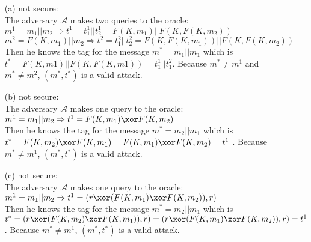 \begin{itemize}
	\item[(a)] not secure:\\
	The adversary $\mathcal{A}$ makes two queries to the oracle:\\
	\(m^1 = m_1 \vert \vert m_2 \Rightarrow t^1 = t^1_1 \vert \vert t^1_2 = F(K, m_1) \vert \vert F(K, F(K, m_2))\)\\
	\(m^2 = F(K, m_1) \vert \vert m_2 \Rightarrow t^2 = t^2_1 \vert \vert t^2_2= F(K, F(K, m_1)) \vert \vert F(K, F(K, m_2))\)\\
	Then he knows the tag for the message \(m^* = m_1 \vert \vert m_1\) which is \(t^* = F(K, m1) \vert \vert F(K, F(K, m1)) = t^1_1 \vert \vert t^2_1\). Because \(m^* \neq m^1\) and \(m^* \neq m^2\), \((m^*, t^*)\) is a valid attack.
	
	\item[(b)] not secure:\\
	The adversary $\mathcal{A}$ makes one query to the oracle:\\
	\(m^1 = m_1 \vert \vert m_2 \Rightarrow t^1 = F(K, m_1) \xor F(K, m_2) \)\\
	Then he knows the tag for the message \(m^* = m_2 \vert \vert m_1\) which is \(t^* = F(K, m_2) \xor F(K, m_1) = F(K, m_1) \xor F(K, m_2) = t^1\) . Because \(m^* \neq m^1\), \((m^*, t^*)\) is a valid attack.
	
	\item[(c)] not secure:\\
	The adversary $\mathcal{A}$ makes one query to the oracle:\\
	\(m^1 = m_1 \vert \vert m_2 \Rightarrow t^1 = (r \xor (F(K, m_1) \xor F(K, m_2)), r) \)\\
	Then he knows the tag for the message \(m^* = m_2 \vert \vert m_1\) which is \(t^* = (r \xor (F(K, m_2) \xor F(K, m_1)), r) = (r \xor (F(K, m_1) \xor F(K, m_2)), r) = t^1\) . Because \(m^* \neq m^1\), \((m^*, t^*)\) is a valid attack.
	
\end{itemize}  
  